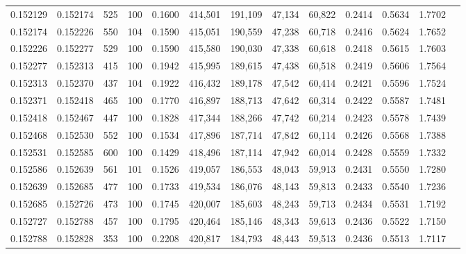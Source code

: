 \begin{tabular}{rrrrrrrrrrrrr}
0.152129 & 0.152174 &   525 & 100 &                                     0.1600 & 414,501 & 191,109 &  47,134 &  60,822 & 0.2414 & 0.5634 & 1.7702 \\
0.152174 & 0.152226 &   550 & 104 &                                     0.1590 & 415,051 & 190,559 &  47,238 &  60,718 & 0.2416 & 0.5624 & 1.7652 \\
0.152226 & 0.152277 &   529 & 100 &                                     0.1590 & 415,580 & 190,030 &  47,338 &  60,618 & 0.2418 & 0.5615 & 1.7603 \\
0.152277 & 0.152313 &   415 & 100 &                                     0.1942 & 415,995 & 189,615 &  47,438 &  60,518 & 0.2419 & 0.5606 & 1.7564 \\
0.152313 & 0.152370 &   437 & 104 &                                     0.1922 & 416,432 & 189,178 &  47,542 &  60,414 & 0.2421 & 0.5596 & 1.7524 \\
0.152371 & 0.152418 &   465 & 100 &                                     0.1770 & 416,897 & 188,713 &  47,642 &  60,314 & 0.2422 & 0.5587 & 1.7481 \\
0.152418 & 0.152467 &   447 & 100 &                                     0.1828 & 417,344 & 188,266 &  47,742 &  60,214 & 0.2423 & 0.5578 & 1.7439 \\
0.152468 & 0.152530 &   552 & 100 &                                     0.1534 & 417,896 & 187,714 &  47,842 &  60,114 & 0.2426 & 0.5568 & 1.7388 \\
0.152531 & 0.152585 &   600 & 100 &                                     0.1429 & 418,496 & 187,114 &  47,942 &  60,014 & 0.2428 & 0.5559 & 1.7332 \\
0.152586 & 0.152639 &   561 & 101 &                                     0.1526 & 419,057 & 186,553 &  48,043 &  59,913 & 0.2431 & 0.5550 & 1.7280 \\
0.152639 & 0.152685 &   477 & 100 &                                     0.1733 & 419,534 & 186,076 &  48,143 &  59,813 & 0.2433 & 0.5540 & 1.7236 \\
0.152685 & 0.152726 &   473 & 100 &                                     0.1745 & 420,007 & 185,603 &  48,243 &  59,713 & 0.2434 & 0.5531 & 1.7192 \\
0.152727 & 0.152788 &   457 & 100 &                                     0.1795 & 420,464 & 185,146 &  48,343 &  59,613 & 0.2436 & 0.5522 & 1.7150 \\
0.152788 & 0.152828 &   353 & 100 &                                     0.2208 & 420,817 & 184,793 &  48,443 &  59,513 & 0.2436 & 0.5513 & 1.7117 \\

\end{tabular}
